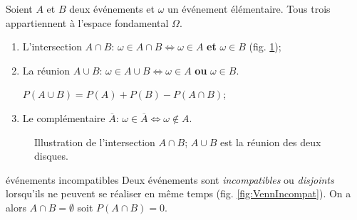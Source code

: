 \documentclass[a4paper,12pt]{scrartcl}
\begin{document}
Soient $A$ et $B$ deux événements et $\omega$ un événement élémentaire. Tous trois appartiennent à l'espace fondamental $\Omega$.

\begin{enumerate}
 \item L'intersection $A \cap B$: $\omega \in A \cap B \Leftrightarrow \omega \in A$ \textbf{et} $\omega \in B$ (fig. \ref{fig:Venn1});
 \item La réunion $A \cup B$: $\omega \in A \cup B \Leftrightarrow \omega \in A$ \textbf{ou} $\omega \in B$. 
 
 $P(A \cup B) = P(A) + P(B) - P(A \cap B)$;
 \item Le complémentaire $\overline{A}$: $\omega \in \overline{A} \Leftrightarrow \omega \nin A$.
\end{enumerate}

\begin{figure}[h!]
\begin{center}
\end{center}
\caption{Illustration de l'intersection $A \cap B$; $A \cup B$ est la réunion des deux disques.}
\label{fig:Venn1}
\end{figure}

\begin{definition}{événements incompatibles} 
    Deux événements sont \emph{incompatibles} ou \emph{disjoints} lorsqu'ils ne peuvent se réaliser en même temps (fig. \ref{fig:VennIncompat}).    
    On a alors $A \cap B = \emptyset$ soit $P(A \cap B) = 0$.
\end{definition}
\end{document}
